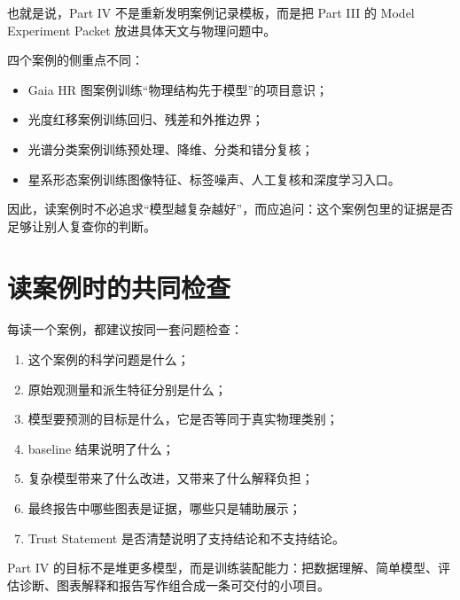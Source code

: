 也就是说，Part IV 不是重新发明案例记录模板，而是把 Part III 的 Model Experiment Packet 放进具体天文与物理问题中。

四个案例的侧重点不同：

\begin{itemize}
    \item Gaia HR 图案例训练“物理结构先于模型”的项目意识；
    \item 光度红移案例训练回归、残差和外推边界；
    \item 光谱分类案例训练预处理、降维、分类和错分复核；
    \item 星系形态案例训练图像特征、标签噪声、人工复核和深度学习入口。
\end{itemize}

因此，读案例时不必追求“模型越复杂越好”，而应追问：这个案例包里的证据是否足够让别人复查你的判断。

\section*{读案例时的共同检查}

每读一个案例，都建议按同一套问题检查：

\begin{enumerate}
    \item 这个案例的科学问题是什么；
    \item 原始观测量和派生特征分别是什么；
    \item 模型要预测的目标是什么，它是否等同于真实物理类别；
    \item baseline 结果说明了什么；
    \item 复杂模型带来了什么改进，又带来了什么解释负担；
    \item 最终报告中哪些图表是证据，哪些只是辅助展示；
    \item Trust Statement 是否清楚说明了支持结论和不支持结论。
\end{enumerate}

\begin{protip}
Part IV 的目标不是堆更多模型，而是训练装配能力：把数据理解、简单模型、评估诊断、图表解释和报告写作组合成一条可交付的小项目。
\end{protip}
